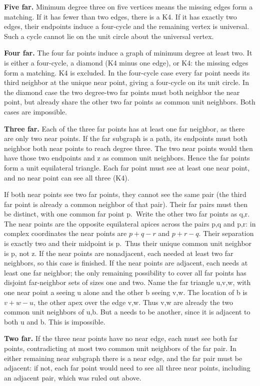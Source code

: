 \documentclass[
  11pt,
]{article}
\begin{document}
\textbf{Five far.} Minimum degree three on five vertices means the
missing edges form a matching. If it has fewer than two edges, there is
a K4. If it has exactly two edges, their endpoints induce a four-cycle
and the remaining vertex is universal. Such a cycle cannot lie on the
unit circle about the universal vertex.

\textbf{Four far.} The four far points induce a graph of minimum degree
at least two. It is either a four-cycle, a diamond (K4 minus one edge),
or K4: the missing edges form a matching. K4 is excluded. In the
four-cycle case every far point needs its third neighbor at the unique
near point, giving a four-cycle on its unit circle. In the diamond case
the two degree-two far points must both neighbor the near point, but
already share the other two far points as common unit neighbors. Both
cases are impossible.

\textbf{Three far.} Each of the three far points has at least one far
neighbor, as there are only two near points. If the far subgraph is a
path, its endpoints must both neighbor both near points to reach degree
three. The two near points would then have those two endpoints and z as
common unit neighbors. Hence the far points form a unit equilateral
triangle. Each far point must see at least one near point, and no near
point can see all three (K4).

If both near points see two far points, they cannot see the same pair
(the third far point is already a common neighbor of that pair). Their
far pairs must then be distinct, with one common far point p.~Write the
other two far points as q,r. The near points are the opposite
equilateral apices across the pairs p,q and p,r: in complex coordinates
the near points are \(p+q-r\) and \(p+r-q\). Their separation is exactly
two and their midpoint is p.~Thus their unique common unit neighbor is
p, not z. If the near points are nonadjacent, each needed at least two
far neighbors, so this case is finished. If the near points are
adjacent, each needs at least one far neighbor; the only remaining
possibility to cover all far points has disjoint far-neighbor sets of
sizes one and two. Name the far triangle u,v,w, with one near point a
seeing u alone and the other b seeing v,w. The location of b is
\(v+w-u\), the other apex over the edge v,w. Thus v,w are already the
two common unit neighbors of u,b. But a needs to be another, since it is
adjacent to both u and b. This is impossible.

\textbf{Two far.} If the three near points have no near edge, each must
see both far points, contradicting at most two common unit neighbors of
the far pair. In either remaining near subgraph there is a near edge,
and the far pair must be adjacent: if not, each far point would need to
see all three near points, including an adjacent pair, which was ruled
out above.
\end{document}

